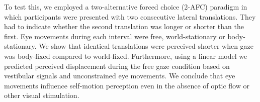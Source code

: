 To test this, we employed a two-alternative forced choice (2-AFC) paradigm in which participants were presented with two consecutive lateral translations. They had to indicate whether the second translation was longer or shorter than the first. Eye movements during each interval were free, world-stationary or body-stationary. We show that identical translations were perceived shorter when gaze was body-fixed compared to world-fixed. Furthermore, using a linear model we predicted perceived displacement during the free gaze condition based on vestibular signals and unconstrained eye movements. We conclude that eye movements influence self-motion perception even in the absence of optic flow or other visual stimulation.